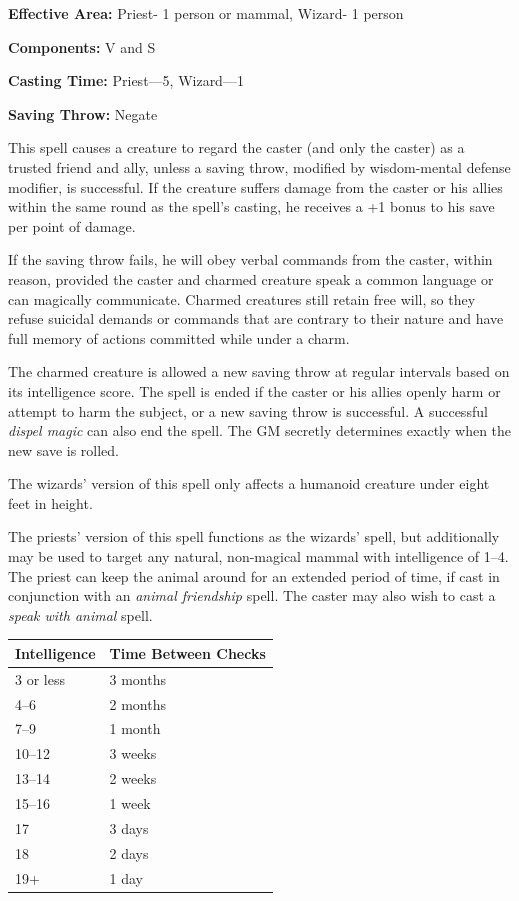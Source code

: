 \begin{multicols}{2}
\begin{minipage}{\columnwidth}
\noindent \textbf{Effective Area:} Priest- 1 person or mammal, Wizard- 1 person

\noindent \textbf{Components:} V and S

\noindent \textbf{Casting Time:} Priest---5, Wizard---1

\noindent \textbf{Saving Throw:} Negate

\end{minipage}

This spell causes a creature to regard the caster (and only the caster) as a trusted friend and ally, unless a saving throw, modified by wisdom-mental defense modifier, is successful.  If the creature suffers damage from the caster or his allies within the same round as the spell's casting, he receives a +1 bonus to his save per point of damage.  

If the saving throw fails, he will obey verbal commands from the caster, within reason, provided the caster and charmed creature speak a common language or can magically communicate.  Charmed creatures still retain free will, so they refuse suicidal demands or commands that are contrary to their nature and have full memory of actions committed while under a charm.  

The charmed creature is allowed a new saving throw at regular intervals based on its intelligence score.  The spell is ended if the caster or his allies openly harm or attempt to harm the subject, or a new saving throw is successful.  A successful \textit{dispel magic} can also end the spell.  The GM secretly determines exactly when the new save is rolled.

The wizards' version of this spell only affects a humanoid creature under eight feet in height.  

The priests' version of this spell functions as the wizards' spell, but additionally may be used to target any natural, non-magical mammal with intelligence of 1--4.  The priest can keep the animal around for an extended period of time, if cast in conjunction with an \textit{animal friendship} spell.  The caster may also wish to cast a \textit{speak with animal} spell.

\noindent
\begin{tabular}{|p{}|p{}|}
\hline
Intelligence	& Time Between Checks \\
\hline\hline
\rowcolor[gray]{.9}3 or less	& 3 months \\
4--6	& 2 months \\
\rowcolor[gray]{.9}7--9	& 1 month \\
10--12	& 3 weeks \\
\rowcolor[gray]{.9}13--14	& 2 weeks \\
15--16	& 1 week \\
\rowcolor[gray]{.9}17	& 3 days \\
18	& 2 days \\
\rowcolor[gray]{.9}19+	& 1 day \\
\hline
\end{tabular}


\end{multicols}
